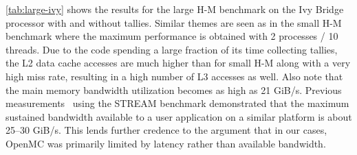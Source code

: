 \documentclass{mc2015}
\begin{document}
\autoref{tab:large-ivy} shows the results for the large H-M benchmark on the
Ivy Bridge processor with and without tallies. Similar themes are seen as in
the small H-M benchmark where the maximum performance is obtained with 2
processes / 10 threads. Due to the code spending a large fraction of its time
collecting tallies, the L2 data cache accesses are much higher than for small
H-M along with a very high miss rate, resulting in a high number of L3 accesses
as well. Also note that the main memory bandwidth utilization becomes as high
as 21 GiB/s. Previous measurements~\cite{ane-tramm-2014} using the STREAM
benchmark demonstrated that the maximum sustained bandwidth available to a user
application on a similar platform is about 25--30 GiB/s. This lends further
credence to the argument that in our cases, OpenMC was primarily limited by
latency rather than available bandwidth.
\end{document}
